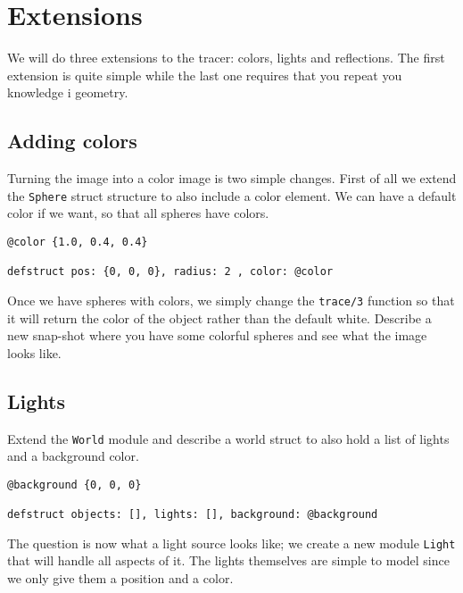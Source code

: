 \documentclass[a4paper,11pt]{article}
\begin{document}

\section{Extensions}

We will do three extensions to the tracer: colors, lights and
reflections. The first extension is quite simple while the last one
requires that you repeat you knowledge i geometry. 

\subsection*{Adding colors}

Turning the image into a color image is two simple changes. First of
all we extend the {\tt Sphere} struct structure to also include a
color element. We can have a default color if we want, so that all
spheres have colors.

\begin{verbatim}
@color {1.0, 0.4, 0.4}

defstruct pos: {0, 0, 0}, radius: 2 , color: @color

\end{verbatim}

Once we have spheres with colors, we simply change the {\tt trace/3}
function so that it will return the color of the object rather than
the default white. Describe a new snap-shot where you have some
colorful spheres and see what the image looks like.

\subsection{Lights}

Extend the {\tt World} module and describe a world struct to also hold
a list of lights and a background color.

\begin{verbatim}
@background {0, 0, 0}

defstruct objects: [], lights: [], background: @background
\end{verbatim}

The question is now what a light source looks like; we create a new
module {\tt Light} that will handle all aspects of it. The lights
themselves are simple to model since we only give them a position and a
color.
\end{document}
